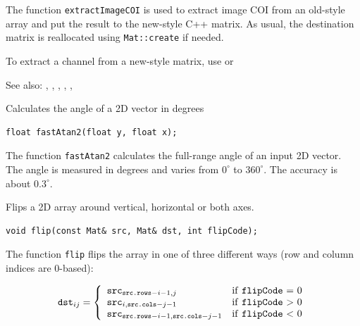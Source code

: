 The function \texttt{extractImageCOI} is used to extract image COI from an old-style array and put the result to the new-style C++ matrix. As usual, the destination matrix is reallocated using \texttt{Mat::create} if needed.

To extract a channel from a new-style matrix, use  or 

See also: , , , , , 


\label{fastAtan2}
Calculates the angle of a 2D vector in degrees

\begin{lstlisting}
float fastAtan2(float y, float x);
\end{lstlisting}
\begin{description}
\end{description}

The function \texttt{fastAtan2} calculates the full-range angle of an input 2D vector. The angle is 
measured in degrees and varies from $0^\circ$ to $360^\circ$. The accuracy is about $0.3^\circ$.

\label{flip}
Flips a 2D array around vertical, horizontal or both axes.

\begin{lstlisting}
void flip(const Mat& src, Mat& dst, int flipCode);
\end{lstlisting}
\begin{description}
\end{description}

The function \texttt{flip} flips the array in one of three different ways (row and column indices are 0-based):

\[
\texttt{dst}_{ij} = \left\{ \begin{array}{l l} \texttt{src}_{\texttt{src.rows}-i-1,j} & \mbox{if \texttt{flipCode} = 0}\\ \texttt{src}_{i,\texttt{src.cols}-j-1} & \mbox{if \texttt{flipCode} > 0}\\ \texttt{src}_{\texttt{src.rows}-i-1,\texttt{src.cols}-j-1} & \mbox{if \texttt{flipCode} < 0}\\ \end{array} \right.
\]

